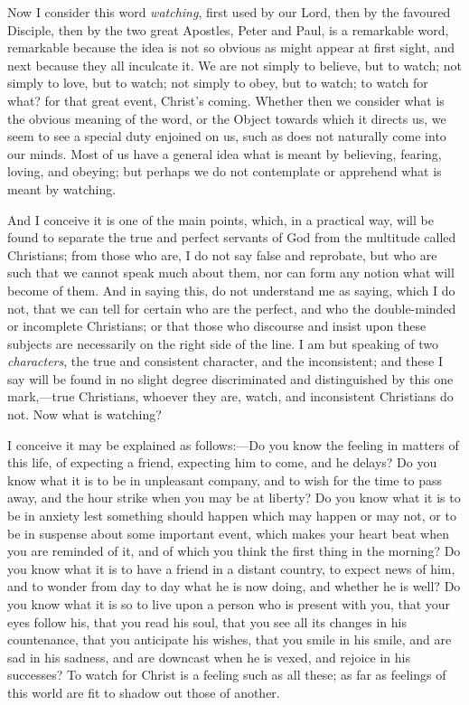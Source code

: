 Now I consider this word \emph{watching}, first used by our Lord,
then by the favoured Disciple, then by the two great Apostles, Peter
and Paul, is a remarkable word, remarkable because the idea is not so
obvious as might appear at first sight, and next because they all
inculcate it. We are not simply to believe, but to watch; not simply
to love, but to watch; not simply to obey, but to watch; to watch for
what? for that great event, Christ's coming. Whether then we consider
what is the obvious meaning of the word, or the Object towards which
it directs us, we seem to see a special duty enjoined on us, such as
does not naturally come into our minds. Most of us have a general idea
what is meant by believing, fearing, loving, and obeying; but perhaps
we do not contemplate or apprehend what is meant by watching.

And I conceive it is one of the main points, which, in a practical
way, will be found to separate the true and perfect servants of God
from the multitude called Christians; from those who are, I do not say
false and reprobate, but who are such that we cannot speak much about
them, nor can form any notion what will become of them. And in saying
this, do not understand me as saying, which I do not, that we can tell
for certain who are the perfect, and who the double-minded or
incomplete Christians; or that those who discourse and insist upon
these subjects are necessarily on the right side of the line. I am but
speaking of two \emph{characters}, the true and consistent character,
and the inconsistent; and these I say will be found in no slight
degree discriminated and distinguished by this one mark,—true
Christians, whoever they are, watch, and inconsistent Christians do
not. Now what is watching?

I conceive it may be explained as follows:—Do you know the
feeling in matters of this life, of expecting a friend, expecting him
to come, and he delays? Do you know what it is to be in unpleasant
company, and to wish for the time to pass away, and the hour strike
when you may be at liberty? Do you know what it is to be in anxiety
lest something should happen which may happen or may not, or to be in
suspense about some important event, which makes your heart beat when
you are reminded of it, and of which you think the first thing in the
morning? Do you know what it is to have a friend in a distant country,
to expect news of him, and to wonder from day to day what he is now
doing, and whether he is well? Do you know what it is so to live upon
a person who is present with you, that your eyes follow his, that you
read his soul, that you see all its changes in his countenance, that
you anticipate his wishes, that you smile in his smile, and are sad in
his sadness, and are downcast when he is vexed, and rejoice in his
successes? To watch for Christ is a feeling such as all these; as far
as feelings of this world are fit to shadow out those of another.

